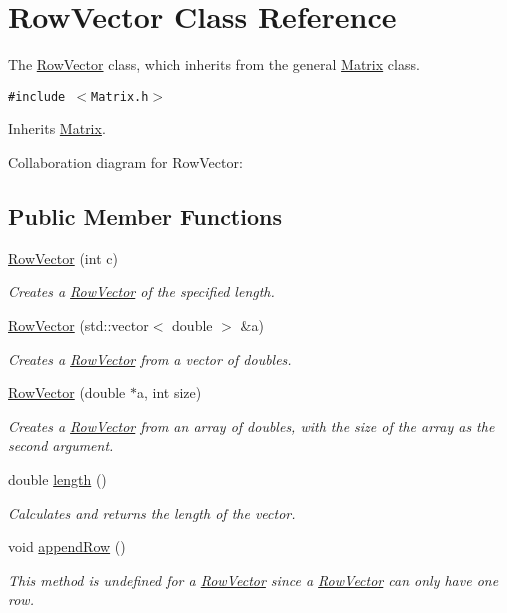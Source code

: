 \hypertarget{class_row_vector}{
\section{RowVector Class Reference}
\label{class_row_vector}
}
The \hyperlink{class_row_vector}{RowVector} class, which inherits from the general \hyperlink{class_matrix}{Matrix} class.  


{\tt \#include $<$Matrix.h$>$}

Inherits \hyperlink{class_matrix}{Matrix}.

Collaboration diagram for RowVector:\subsection*{Public Member Functions}
\begin{CompactItemize}
\item 
\hyperlink{class_row_vector_2f27ef01198c0c996290f5d6d1680297}{RowVector} (int c)
\begin{CompactList}\small\item\em Creates a \hyperlink{class_row_vector}{RowVector} of the specified length. \item\end{CompactList}\item 
\hyperlink{class_row_vector_6f0b27522b67138a7313c4a75750a7a6}{RowVector} (std::vector$<$ double $>$ \&a)
\begin{CompactList}\small\item\em Creates a \hyperlink{class_row_vector}{RowVector} from a vector of doubles. \item\end{CompactList}\item 
\hyperlink{class_row_vector_fdb9cc1d09c9dfaef6af93aec542f498}{RowVector} (double $\ast$a, int size)
\begin{CompactList}\small\item\em Creates a \hyperlink{class_row_vector}{RowVector} from an array of doubles, with the size of the array as the second argument. \item\end{CompactList}\item 
double \hyperlink{class_row_vector_5c2dde299464fd200026db5515480275}{length} ()
\begin{CompactList}\small\item\em Calculates and returns the length of the vector. \item\end{CompactList}\item 
void \hyperlink{class_row_vector_a04552c6bdfed758bc06815d8696b44c}{appendRow} ()
\begin{CompactList}\small\item\em This method is undefined for a \hyperlink{class_row_vector}{RowVector} since a \hyperlink{class_row_vector}{RowVector} can only have one row. \item\end{CompactList}\end{CompactItemize}


